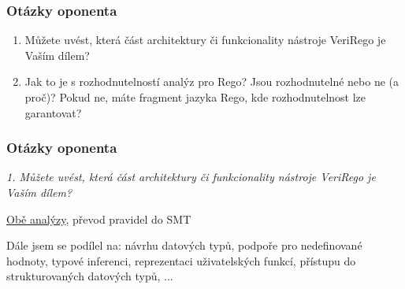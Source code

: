



\appendix{}
\begin{frame}
  \frametitle{Otázky oponenta}
  \begin{enumerate}
    \item Můžete uvést, která část architektury či funkcionality nástroje VeriRego je Vaším dílem?
      \item Jak to je s rozhodnutelností analýz pro Rego? Jsou rozhodnutelné nebo ne (a proč)? Pokud ne, máte fragment jazyka Rego, kde rozhodnutelnost lze garantovat?
  \end{enumerate}
  \bigskip
\end{frame}

\begin{frame}
  \frametitle{Otázky oponenta}
   \textit{  1. Můžete uvést, která část architektury či funkcionality nástroje VeriRego je Vaším dílem?}
  \bigskip

  \underline{Obě analýzy}, převod pravidel do SMT
  \bigskip
  \bigskip

  \small Dále jsem se podílel na: návrhu datových typů, podpoře pro nedefinované hodnoty, typové inferenci, reprezentaci uživatelských funkcí, přístupu do strukturovaných datových typů, ...
\end{frame}


